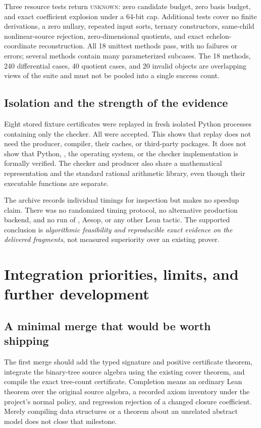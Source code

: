 \documentclass[11pt,letterpaper]{article}
\theoremstyle{definition}\newtheorem{definition}[theorem]{Definition}
\theoremstyle{remark}\newtheorem{remark}[theorem]{Remark}
\newcommand{\code}[1]{\texttt{\detokenize{#1}}}
\newcommand{\unknown}{\textsc{unknown}}
\begin{document}
Three resource tests return \unknown{}: zero candidate budget, zero basis budget, and exact coefficient explosion under a 64-bit cap. Additional tests cover no finite derivations, a zero nullary, repeated input sorts, ternary constructors, same-child nonlinear-source rejection, zero-dimensional quotients, and exact echelon-coordinate reconstruction. All 18 unittest methods pass, with no failures or errors; several methods contain many parameterized subcases. The 18 methods, 240 differential cases, 40 quotient cases, and 20 invalid objects are overlapping views of the suite and must not be pooled into a single success count.

\subsection{Isolation and the strength of the evidence}
Eight stored fixture certificates were replayed in fresh isolated Python processes containing only the checker. All were accepted. This shows that replay does not need the producer, compiler, their caches, or third-party packages. It does not show that Python, \code{Fraction}, the operating system, or the checker implementation is formally verified. The checker and producer also share a mathematical representation and the standard rational arithmetic library, even though their executable functions are separate.

The archive records individual timings for inspection but makes no speedup claim. There was no randomized timing protocol, no alternative production backend, and no run of \code{grind}, Aesop, or any other Lean tactic. The supported conclusion is \emph{algorithmic feasibility and reproducible exact evidence on the delivered fragments}, not measured superiority over an existing prover.

\section{Integration priorities, limits, and further development}
\label{sec:roadmap}

\subsection{A minimal merge that would be worth shipping}
The first merge should add the typed signature and positive certificate theorem, integrate the binary-tree source algebra using the existing cover theorem, and compile the exact tree-count certificate. Completion means an ordinary Lean theorem over the original source algebra, a recorded axiom inventory under the project's normal policy, and regression rejection of a changed closure coefficient. Merely compiling data structures or a theorem about an unrelated abstract model does not close that milestone.
\end{document}
